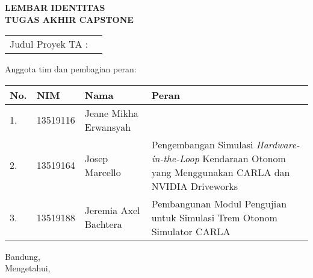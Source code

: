 \clearpage
\pagestyle{empty}

\begin{center}
	\smallskip

	\Large \bfseries \MakeUppercase{
		Lembar Identitas \\
		Tugas Akhir Capstone
	}
	\vspace{0.5cm}

	\raggedright
	\begin{table}[h!]
		\large \bfseries
		\begin{onehalfspace}
		\begin{tabular}{p{} p{}}
			Judul Proyek TA : & \capstonetitle \\
		\end{tabular}
		\end{onehalfspace}
	\end{table}

	\normalsize \normalfont

	Anggota tim dan pembagian peran:

	\begin{table}[h!]
		\begin{onehalfspace}
		\begingroup
		\def\arraystretch{1.25}
		\begin{tabular}{|p{} | p{} | p{} | p{0.50\textwidth}|}
			\hline
			\textbf{No.} & \textbf{NIM} & \textbf{Nama}         & \textbf{Peran} \\
			\hline
			1.           & 13519116     & Jeane Mikha Erwansyah & \thetitle \\
			\hline
			2.           & 13519164     & Josep Marcello        & Pengembangan Simulasi \textit{Hardware-in-the-Loop} Kendaraan Otonom yang Menggunakan CARLA dan NVIDIA Driveworks \\
			\hline
			3.           & 13519188     & Jeremia Axel Bachtera & Pembangunan Modul Pengujian untuk Simulasi Trem Otonom Simulator CARLA \\
			\hline
		\end{tabular}
		\endgroup
		\end{onehalfspace}
	\end{table}

	\vfill
	\begin{center}
		\normalsize \normalfont
		Bandung, \thedate \\
		Mengetahui,
	\end{center}
	\advisorapproval

\end{center}
\clearpage
